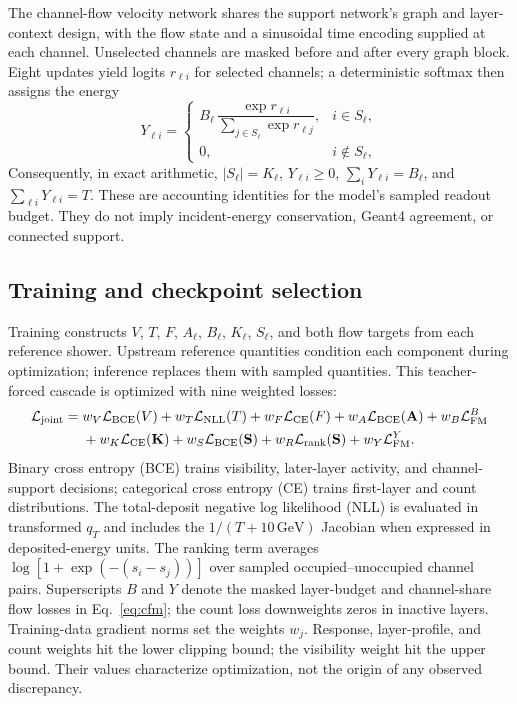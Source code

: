 \documentclass[11pt]{article}
\newcommand{\GeV}{\,\mathrm{GeV}}
\begin{document}
The channel-flow velocity network shares the support network's graph and layer-context design, with the flow state and a sinusoidal time encoding supplied at each channel. Unselected channels are masked before and after every graph block. Eight updates yield logits $r_{\ell i}$ for selected channels; a deterministic softmax then assigns the energy
\begin{equation}
 Y_{\ell i}=
 \begin{cases}
 B_\ell\,\dfrac{\exp r_{\ell i}}{\sum_{j\in S_\ell}\exp r_{\ell j}}, & i\in S_\ell,\\[6pt]
 0, & i\notin S_\ell,
 \end{cases}
 \label{eq:decoder}
\end{equation}
Consequently, in exact arithmetic, $|S_\ell|=K_\ell$, $Y_{\ell i}\geq0$, $\sum_iY_{\ell i}=B_\ell$, and $\sum_{\ell i}Y_{\ell i}=T$. These are accounting identities for the model's sampled readout budget. They do not imply incident-energy conservation, Geant4 agreement, or connected support.

\subsection{Training and checkpoint selection}

Training constructs $V$, $T$, $F$, $A_\ell$, $B_\ell$, $K_\ell$, $S_\ell$, and both flow targets from each reference shower. Upstream reference quantities condition each component during optimization; inference replaces them with sampled quantities. This teacher-forced cascade is optimized with nine weighted losses:
\begin{equation}
 \begin{aligned}
 \mathcal L_{\rm joint}={}&w_V\mathcal L_{\rm BCE}(V)
 +w_T\mathcal L_{\rm NLL}(T)
 +w_F\mathcal L_{\rm CE}(F)
 +w_A\mathcal L_{\rm BCE}(\mathbf A)
 +w_B\mathcal L_{\rm FM}^{B}\\
 &+w_K\mathcal L_{\rm CE}(\mathbf K)
 +w_S\mathcal L_{\rm BCE}(\mathbf S)
 +w_R\mathcal L_{\rm rank}(\mathbf S)
 +w_Y\mathcal L_{\rm FM}^{Y}.
 \end{aligned}
 \label{eq:joint_loss}
\end{equation}
Binary cross entropy (BCE) trains visibility, later-layer activity, and channel-support decisions; categorical cross entropy (CE) trains first-layer and count distributions. The total-deposit negative log likelihood (NLL) is evaluated in transformed $q_T$ and includes the $1/(T+10\GeV)$ Jacobian when expressed in deposited-energy units. The ranking term averages $\log[1+\exp(-(s_i-s_j))]$ over sampled occupied--unoccupied channel pairs. Superscripts $B$ and $Y$ denote the masked layer-budget and channel-share flow losses in Eq.~\eqref{eq:cfm}; the count loss downweights zeros in inactive layers. Training-data gradient norms set the weights $w_j$. Response, layer-profile, and count weights hit the lower clipping bound; the visibility weight hit the upper bound. Their values characterize optimization, not the origin of any observed discrepancy.
\end{document}
